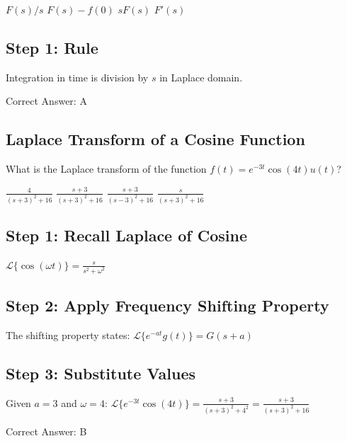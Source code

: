 \begin{choices}
    \correctchoice $F(s) / s$
    \choice $F(s) - f(0)$
    \choice $s F(s)$
    \choice $F'(s)$
\end{choices}

\begin{solution}

\subsection*{Step 1: Rule}
Integration in time is division by $s$ in Laplace domain.

Correct Answer: A
\end{solution}

\clearpage

\subsection{Laplace Transform of a Cosine Function}

What is the Laplace transform of the function $f(t) = e^{-3t} \cos(4t) u(t)$?

\begin{choices}
    \choice $\frac{4}{(s+3)^2 + 16}$
    \correctchoice $\frac{s+3}{(s+3)^2 + 16}$
    \choice $\frac{s+3}{(s-3)^2 + 16}$
    \choice $\frac{s}{(s+3)^2 + 16}$
\end{choices}

\begin{solution}

\subsection*{Step 1: Recall Laplace of Cosine}
$\mathcal{L}\{\cos(\omega t)\} = \frac{s}{s^2 + \omega^2}$

\subsection*{Step 2: Apply Frequency Shifting Property}
The shifting property states:
$\mathcal{L}\{e^{-at} g(t)\} = G(s+a)$

\subsection*{Step 3: Substitute Values}
Given $a = 3$ and $\omega = 4$:
$\mathcal{L}\{e^{-3t} \cos(4t)\} = \frac{s+3}{(s+3)^2 + 4^2} = \frac{s+3}{(s+3)^2 + 16}$

Correct Answer: B
\end{solution}

